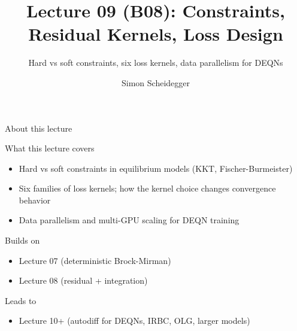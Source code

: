 \documentclass[aspectratio=169,11pt]{beamer}
\title[Lecture 09 (B08)]{Lecture 09 (B08): Constraints, Residual Kernels, Loss Design}
\subtitle{Hard vs soft constraints, six loss kernels, data parallelism for DEQNs}
\author{Simon Scheidegger}
\institute{HEC, University of Lausanne}
\date{}
\begin{document}
\providecommand{\exercisepause}{%
  \tikz[baseline=(X.base)]{\node[fill=darkgreen!80!black, text=white,
  rounded corners=2pt, inner sep=3pt, font=\scriptsize\bfseries](X){PAUSE};}}

{
\begin{frame}
\titlepage
\end{frame}
}

\begin{frame}{About this lecture}
\small
\begin{block}{What this lecture covers}
\begin{itemize}\itemsep2pt
  \item Hard vs soft constraints in equilibrium models (KKT, Fischer-Burmeister)
  \item Six families of loss kernels; how the kernel choice changes convergence behavior
  \item Data parallelism and multi-GPU scaling for DEQN training
\end{itemize}
\end{block}
\begin{block}{Builds on}
\begin{itemize}\itemsep2pt
  \item Lecture 07 (deterministic Brock-Mirman)
  \item Lecture 08 (residual + integration)
\end{itemize}
\end{block}
\begin{block}{Leads to}
\begin{itemize}\itemsep2pt
  \item Lecture 10+ (autodiff for DEQNs, IRBC, OLG, larger models)
\end{itemize}
\end{block}
\end{frame}
\end{document}
